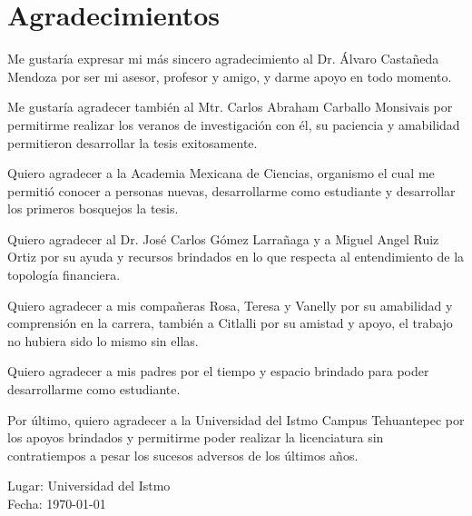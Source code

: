 \chapter*{Agradecimientos}

Me gustaría expresar mi más sincero agradecimiento al Dr. Álvaro Castañeda Mendoza por ser mi asesor, profesor y amigo, y darme apoyo en todo momento.

Me gustaría agradecer también al Mtr. Carlos Abraham Carballo Monsivais por permitirme realizar los veranos de investigación con él, su paciencia y amabilidad permitieron desarrollar la tesis exitosamente.

Quiero agradecer a la Academia Mexicana de Ciencias, organismo el cual me permitió conocer a personas nuevas, desarrollarme como estudiante y desarrollar los primeros bosquejos la tesis.

Quiero agradecer al Dr. José Carlos Gómez Larrañaga y a Miguel Angel Ruiz Ortiz por su ayuda y recursos brindados en lo que respecta al entendimiento de la topología financiera.

Quiero agradecer a mis compañeras Rosa, Teresa y Vanelly por su amabilidad y comprensión en la carrera, también a Citlalli por su amistad y apoyo, el trabajo no hubiera sido lo mismo sin ellas.

Quiero agradecer a mis padres por el tiempo y espacio brindado para poder desarrollarme como estudiante.

Por último, quiero agradecer a la Universidad del Istmo Campus Tehuantepec por los apoyos brindados y permitirme poder realizar la licenciatura sin contratiempos a pesar los sucesos adversos de los últimos años.

\vspace*{1.5cm}
\begin{flushright}
\authorname
\end{flushright}


\vspace*{-1.3cm}
\noindent
Lugar: Universidad del Istmo\\
Fecha: \today 
